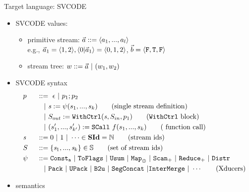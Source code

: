 \documentclass{beamer}
\begin{document}
\begin{frame}{Target language: SVCODE}
	\begin{itemize}
	\item SVCODE values:
		\begin{itemize}
			\item primitive stream: $\a ::= \<a_1,...,a_l\'>$ \\ 
			e.g., $\a_1 = \<1,2\'>,  \<0 | \a_1 \'> = \<0,1,2\'>$, $\b = \<\F, \T , \F\'>$
			\item stream tree: $w ::= \a \ | \ (w_1,w_2)$
		\end{itemize}
		
	\item SVCODE syntax
		{\small \begin{alignat*}{2} 
		&p  && :: = \ \epsilon \ | \ p_1;p_2 \\ 
		&   && \quad | \ \sdef{\s}{\psi(s_1,...,s_k)}  \tag{single stream definition}\\
		&   && \quad | \ \withctrl{\s}{p_1}{\Sin}{\Sout}  \tag{\wc block}\\
		&   && \quad | \ \scall{f}{s_1,...,s_k}{(s_1',...,s_{k'}')} \tag{ function call}\\
		&\s && ::= 0 \ | \ 1 \ | \ \cdots \in \SId  = \mathbb{N}   \tag{stream ids}\\
		&  \S && ::= \{\s_1,..., \s_k\} \in \sset  \tag{set of stream ids}\\
		& \psi \ && ::= \consta{a} \ | \ \toflag  
		\ | \ \usum \ | \ \map{\oplus} \ | \ \genscan_{+} \ | \ \genreduce_{+} \ | \ \distr    \\
		&   && \quad  | \ \pack \ | \ \upack \ | \ \bu \ | \ \segconcat \ | \intermerge \ | \ \cdots  \tag{Xducers} \\	
		\end{alignat*}}
		
		\item semantics
	\end{itemize}
\end{frame}
\end{document}

